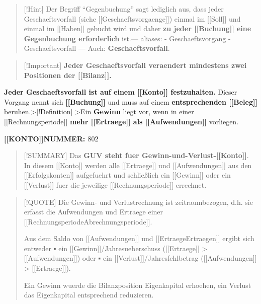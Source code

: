 \begin{quote}
{[}!Hint{]} Der Begriff ``Gegenbuchung'' sagt lediglich aus, dass jeder
Geschaeftsvorfall (siehe {[}{[}Geschaeftsvorgaenge{]}{]}) einmal im
{[}{[}Soll{]}{]} und einmal im {[}{[}Haben{]}{]} gebucht wird und daher
\textbf{zu jeder {[}{[}Buchung{]}{]} eine Gegenbuchung erforderlich}
ist.--- aliases: - Geschaeftsvorgang - Geschaeftsvorfall --- Auch:
\textbf{Geschaeftsvorfall}.
\end{quote}

\begin{quote}
{[}!Important{]} \textbf{Jeder Geschaeftsvorfall veraendert mindestens
zwei Positionen der {[}{[}Bilanz{]}{]}.}
\end{quote}

\textbf{Jeder Geschaeftsvorfall ist auf einem {[}{[}Konto{]}{]}
festzuhalten.} Dieser Vorgang nennt sich \textbf{{[}{[}Buchung{]}{]}}
und muss auf einem \textbf{entsprechenden {[}{[}Beleg{]}{]}}
beruhen.\textgreater{[}!Definition{]} \textgreater Ein \textbf{Gewinn}
liegt vor, wenn in einer {[}{[}Rechnungsperiode{]}{]} \textbf{mehr
{[}{[}Ertraege{]}{]} als {[}{[}Aufwendungen{]}{]}} vorliegen.

\textbf{{[}{[}KONTO{]}{]}NUMMER: \(802\)}

\begin{quote}
{[}!SUMMARY{]} Das \textbf{GUV steht fuer
Gewinn-und-Verlust-{[}{[}Konto{]}{]}}. In diesem {[}{[}Konto{]}{]}
werden alle {[}{[}Ertraege{]}{]} und {[}{[}Aufwendungen{]}{]} aus den
{[}{[}Erfolgskonten{]}{]} aufgefuehrt und schließlich ein
{[}{[}Gewinn{]}{]} oder ein {[}{[}Verlust{]}{]} fuer die jeweilige
{[}{[}Rechnungsperiode{]}{]} errechnet.
\end{quote}

\begin{quote}
{[}!QUOTE{]} Die Gewinn- und Verlustrechnung ist zeitraumbezogen, d.h.
sie erfasst die Aufwendungen und Ertraege einer
{[}{[}Rechnungsperiode\textbar Abrechnungsperiode{]}{]}.

Aus dem Saldo von {[}{[}Aufwendungen{]}{]} und
{[}{[}Ertraege\textbar Ertraegen{]}{]} ergibt sich entweder ▪ ein
{[}{[}Gewinn{]}{]}/Jahresueberschuss ({[}{[}Ertraege{]}{]} \textgreater{}
{[}{[}Aufwendungen{]}{]}) oder ▪ ein
{[}{[}Verlust{]}{]}/Jahresfehlbetrag ({[}{[}Aufwendungen{]}{]}
\textgreater{} {[}{[}Ertraege{]}{]}).

Ein Gewinn wuerde die Bilanzposition Eigenkapital erhoehen, ein Verlust
das Eigenkapital entsprechend reduzieren.
\end{quote}

